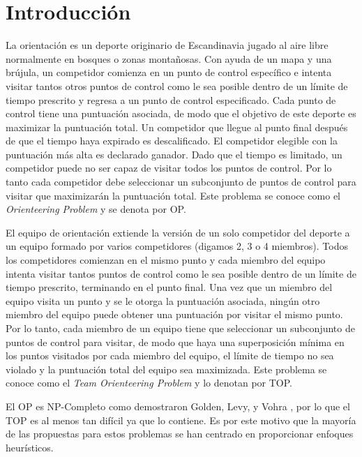 \chapter{Introducción}

La orientación es un deporte originario de Escandinavia jugado al aire libre normalmente en bosques o zonas montañosas. Con ayuda de un mapa y una brújula, un competidor comienza en un punto de control específico e intenta visitar tantos otros puntos de control como le sea posible dentro de un límite de tiempo prescrito y regresa a un punto de control especificado. Cada punto de control tiene una puntuación asociada, de modo que el objetivo de este deporte es maximizar la puntuación total. Un competidor que llegue al punto final después de que el tiempo haya expirado es descalificado. El competidor elegible con la puntuación más alta es declarado ganador. Dado que el tiempo es limitado, un competidor puede no ser capaz de visitar todos los puntos de control. Por lo tanto cada competidor debe seleccionar un subconjunto de puntos de control para visitar que maximizarán la puntuación total. Este problema se conoce como el \textit{Orienteering Problem} y se denota por OP.

\bigskip

El equipo de orientación extiende la versión de un solo competidor del deporte a un equipo formado por varios competidores (digamos 2, 3 o 4 miembros). Todos los competidores comienzan en el mismo punto y cada miembro del equipo intenta visitar tantos puntos de control como le sea posible dentro de un límite de tiempo prescrito, terminando en el punto final. Una vez que un miembro del equipo visita un punto y se le otorga la puntuación asociada, ningún otro miembro del equipo puede obtener una puntuación por visitar el mismo punto. Por lo tanto, cada miembro de un equipo tiene que seleccionar un subconjunto de puntos de control para visitar, de modo que haya una superposición mínima en los puntos visitados por cada miembro del equipo, el límite de tiempo no sea violado y la puntuación total del equipo sea maximizada. Este problema se conoce como el \textit{Team Orienteering Problem} y lo denotan por TOP.

\bigskip

El OP es NP-Completo como demostraron Golden, Levy, y Vohra \cite{GoldenLevyVohra}, por lo que el TOP es al menos tan difícil ya que lo contiene. Es por este motivo que la mayoría de las propuestas para estos problemas se han centrado en proporcionar enfoques heurísticos.

